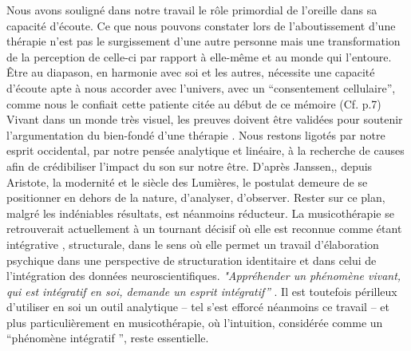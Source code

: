 
Nous avons souligné dans notre travail le rôle primordial de
l'oreille dans sa capacité d'écoute. %
Ce que nous pouvons constater lors de l'aboutissement
d'une thérapie n'est pas le surgissement d'une autre personne mais une transformation
de la perception de celle-ci par rapport à elle-même et au monde qui l'entoure.
Être au diapason, en harmonie avec soi et les autres, nécessite une capacité d'écoute apte à nous 
accorder avec l'univers, avec un \enquote {consentement cellulaire}, comme nous le 
confiait cette patiente citée au début de ce mémoire (Cf. p.7)
\\
Vivant dans un monde très visuel, les preuves doivent être
validées pour soutenir l'argumentation du bien-fondé d'une thérapie
\autocite{vrait_musicotherapie_2018}.
Nous restons
  ligotés par notre esprit occidental, par
  notre pensée analytique et linéaire, à la recherche de
  causes afin de crédibiliser l'impact
  du son sur notre être.
  D'après Janssen,\autocite{van_eersel_cerveau}, depuis Aristote, la modernité et le
siècle des Lumières, le postulat demeure de se positionner en dehors
de la nature, d'analyser, d'observer.
Rester sur ce plan, malgré les
indéniables résultats, est néanmoins
réducteur.
La musicothérapie  se retrouverait actuellement
 à un tournant décisif où elle est reconnue comme étant intégrative
 \autocite{vrait_musicotherapie_2018},
struc\-tu\-rale, dans le sens où elle permet un travail d'élaboration psychique dans une perspective de structuration identitaire  et dans celui de l'intégration des données neuroscientifiques.
\textit{"Appréhender un phénomène vivant, qui est intégratif en soi, demande un esprit
  intégratif''} \autocite[201]{van_eersel_cerveau}.
Il est toutefois périlleux d'utiliser en soi un outil analytique -- tel s'est efforcé néanmoins ce travail -- et
plus
particulièrement en musicothérapie, où l'intuition, 
considérée comme un ``phénomène intégratif '', reste essentielle.


